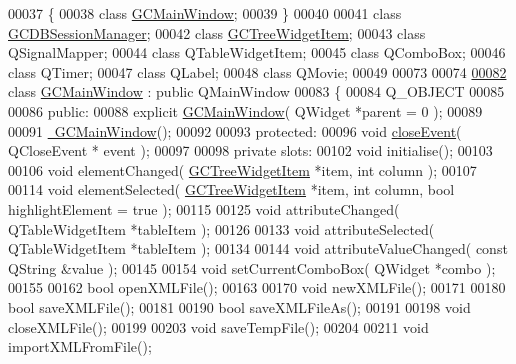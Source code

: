 \begin{DoxyCode}
00037 \{
00038   \textcolor{keyword}{class }\hyperlink{class_g_c_main_window}{GCMainWindow};
00039 \}
00040 
00041 \textcolor{keyword}{class }\hyperlink{class_g_c_d_b_session_manager}{GCDBSessionManager};
00042 \textcolor{keyword}{class }\hyperlink{class_g_c_tree_widget_item}{GCTreeWidgetItem};
00043 \textcolor{keyword}{class }QSignalMapper;
00044 \textcolor{keyword}{class }QTableWidgetItem;
00045 \textcolor{keyword}{class }QComboBox;
00046 \textcolor{keyword}{class }QTimer;
00047 \textcolor{keyword}{class }QLabel;
00048 \textcolor{keyword}{class }QMovie;
00049 
00073 
00074 
\hypertarget{gcmainwindow_8h_source_l00082}{}\hyperlink{class_g_c_main_window}{00082} \textcolor{keyword}{class }\hyperlink{class_g_c_main_window}{GCMainWindow} : \textcolor{keyword}{public} QMainWindow
00083 \{
00084   Q\_OBJECT
00085   
00086 \textcolor{keyword}{public}:
00088   \textcolor{keyword}{explicit} \hyperlink{class_g_c_main_window_ab20de5f22439fbb8baf7d6b4be2ef63e}{GCMainWindow}( QWidget *parent = 0 );
00089 
00091   \hyperlink{class_g_c_main_window_a1b9394727a4790a926fae15973f9e629}{~GCMainWindow}();
00092 
00093 \textcolor{keyword}{protected}:
00096   \textcolor{keywordtype}{void} \hyperlink{class_g_c_main_window_a08995f775bad0ea2ff98965ede9c2967}{closeEvent}( QCloseEvent * event );
00097 
00098 \textcolor{keyword}{private} slots:
00102   \textcolor{keywordtype}{void} initialise();
00103 
00106   \textcolor{keywordtype}{void} elementChanged( \hyperlink{class_g_c_tree_widget_item}{GCTreeWidgetItem} *item, \textcolor{keywordtype}{int} column );
00107 
00114   \textcolor{keywordtype}{void} elementSelected( \hyperlink{class_g_c_tree_widget_item}{GCTreeWidgetItem} *item, \textcolor{keywordtype}{int} column, \textcolor{keywordtype}{bool} 
      highlightElement = \textcolor{keyword}{true} );
00115 
00125   \textcolor{keywordtype}{void} attributeChanged( QTableWidgetItem *tableItem );
00126 
00133   \textcolor{keywordtype}{void} attributeSelected( QTableWidgetItem *tableItem );
00134 
00144   \textcolor{keywordtype}{void} attributeValueChanged( \textcolor{keyword}{const} QString &value );
00145 
00154   \textcolor{keywordtype}{void} setCurrentComboBox( QWidget *combo );
00155 
00162   \textcolor{keywordtype}{bool} openXMLFile();
00163 
00170   \textcolor{keywordtype}{void} newXMLFile();
00171 
00180   \textcolor{keywordtype}{bool} saveXMLFile();
00181 
00190   \textcolor{keywordtype}{bool} saveXMLFileAs();
00191 
00198   \textcolor{keywordtype}{void} closeXMLFile();
00199 
00203   \textcolor{keywordtype}{void} saveTempFile();
00204 
00211   \textcolor{keywordtype}{void} importXMLFromFile();

\end{DoxyCode}
